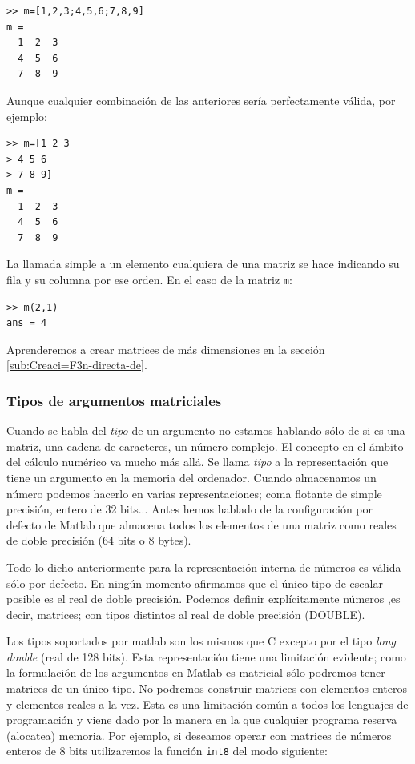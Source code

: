 \begin{lstlisting}
>> m=[1,2,3;4,5,6;7,8,9]
m =
  1  2  3
  4  5  6
  7  8  9
\end{lstlisting}
Aunque cualquier combinación de las anteriores sería perfectamente
válida, por ejemplo:

\begin{lstlisting}
>> m=[1 2 3
> 4 5 6
> 7 8 9]
m =
  1  2  3
  4  5  6
  7  8  9
\end{lstlisting}
La llamada simple a un elemento cualquiera de una matriz se hace
indicando su fila y su columna por ese orden. En el caso de la matriz
\texttt{m}:

\begin{lstlisting}
>> m(2,1)
ans = 4
\end{lstlisting}
Aprenderemos a crear matrices de más dimensiones en la sección
\ref{sub:Creaci=F3n-directa-de}.


\subsubsection{\label{argumentosmatriciales}Tipos de argumentos matriciales}

Cuando se habla del \emph{tipo} de un argumento no estamos hablando
sólo de si es una matriz, una cadena de caracteres, un número
complejo.  El concepto en el ámbito del cálculo numérico va mucho más
allá. Se llama \emph{tipo} a la representación que tiene un argumento
en la memoria del ordenador. Cuando almacenamos un número podemos
hacerlo en varias representaciones; coma flotante de simple precisión,
entero de 32 bits... Antes hemos hablado de la configuración por
defecto de Matlab que almacena todos los elementos de una matriz como
reales de doble precisión (64 bits o 8 bytes).

Todo lo dicho anteriormente para la representación interna de números
es válida sólo por defecto. En ningún momento afirmamos que el único
tipo de escalar posible es el real de doble precisión. Podemos definir
explícitamente números ,es decir, matrices; con tipos distintos al
real de doble precisión (DOUBLE).

Los tipos soportados por matlab son los mismos que C excepto por el
tipo \emph{long double} (real de 128 bits). Esta representación tiene
una limitación evidente; como la formulación de los argumentos en
Matlab es matricial sólo podremos tener matrices de un único tipo.  No
podremos construir matrices con elementos enteros y elementos reales a
la vez. Esta es una limitación común a todos los lenguajes de
programación y viene dado por la manera en la que cualquier programa
reserva (alocatea) memoria. Por ejemplo, si deseamos operar con
matrices de números enteros de 8 bits utilizaremos la función
\texttt{int8} del modo siguiente:

